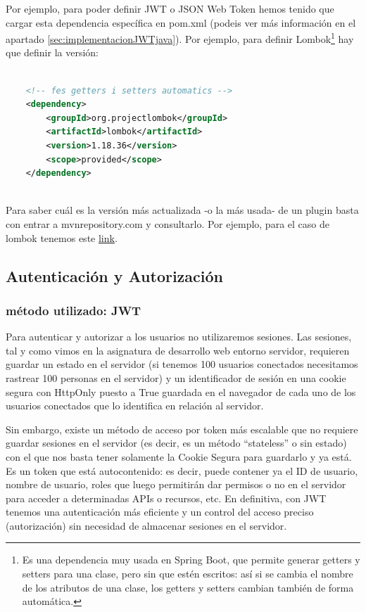 \documentclass[a4paper,12pt]{report}
\begin{document}
				Por ejemplo, para poder definir JWT o JSON Web Token hemos tenido que cargar esta dependencia específica en pom.xml (podeis ver más información en el apartado \ref{sec:implementacionJWTjava}). Por ejemplo, para definir Lombok\footnote{Es una dependencia muy usada en Spring Boot, que permite generar getters y setters para una clase, pero sin que estén escritos: así si se cambia el nombre de los atributos de una clase, los getters y setters cambian también de forma automática.} hay que definir la versión:
				
				
			\begin{lstlisting}[language=XML, basicstyle=\ttfamily\small, keywordstyle=\color{red}]
					
	<!-- fes getters i setters automatics -->
	<dependency>
		<groupId>org.projectlombok</groupId>
		<artifactId>lombok</artifactId>
		<version>1.18.36</version>
		<scope>provided</scope>
	</dependency>
			
			\end{lstlisting}
				 
				
				Para saber cuál es la versión más actualizada -o la más usada- de un plugin basta con entrar a mvnrepository.com y consultarlo. Por ejemplo, para el caso de lombok tenemos este \href{https://mvnrepository.com/artifact/org.projectlombok/lombok}{link}.
			
				
				\subsection{Autenticación y Autorización}
				
				\subsubsection{método utilizado: JWT}
				
				Para autenticar y autorizar a los usuarios no utilizaremos sesiones. Las sesiones, tal y como vimos en la asignatura de desarrollo web entorno servidor, requieren guardar un estado en el servidor (si tenemos 100 usuarios conectados necesitamos rastrear 100 personas en el servidor) y un identificador de sesión en una cookie segura con HttpOnly puesto a True guardada en el navegador de cada uno de los usuarios conectados que lo identifica en relación al servidor.
				
				Sin embargo, existe un método de acceso por token más escalable que no requiere guardar sesiones en el servidor (es decir, es un método ``stateless'' o sin estado) con el que nos basta tener solamente la Cookie Segura para guardarlo y ya está. Es un token que está autocontenido: es decir, puede contener ya el ID de usuario, nombre de usuario, roles que luego permitirán dar permisos o no en el servidor para acceder a determinadas APIs o recursos, etc. En definitiva, con JWT tenemos una autenticación más eficiente y un control del acceso preciso (autorización) sin necesidad de almacenar sesiones en el servidor.
				
\end{document}
